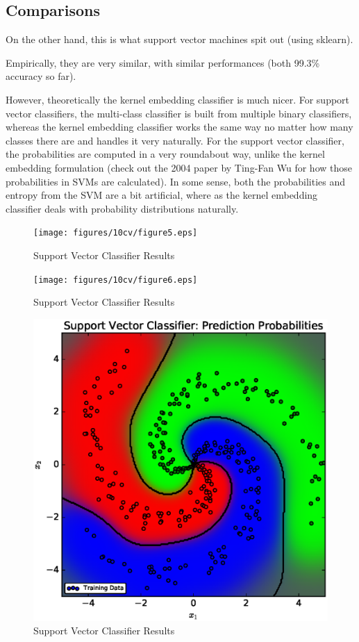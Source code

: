 \documentclass[a4paper, 12pt]{article}
\begin{document}
	\newpage
	\subsection{Comparisons}

		On the other hand, this is what support vector machines spit out (using sklearn).
		
		Empirically, they are very similar, with similar performances (both 99.3\% accuracy so far).
		
		However, theoretically the kernel embedding classifier is much nicer. For support vector classifiers, the multi-class classifier is built from multiple binary classifiers, whereas the kernel embedding classifier works the same way no matter how many classes there are and handles it very naturally. For the support vector classifier, the probabilities are computed in a very roundabout way, unlike the kernel embedding formulation (check out the 2004 paper by Ting-Fan Wu for how those probabilities in SVMs are calculated). In some sense, both the probabilities and entropy from the SVM are a bit artificial, where as the kernel embedding classifier deals with probability distributions naturally.
		

		\begin{figure}[!htbp]
			\centering
			\texttt{[image: figures/10cv/figure5.eps]}
			\caption{Support Vector Classifier Results}
			\label{fig:figure_5}
		\end{figure}
		
		\begin{figure}[!htbp]
			\centering
			\texttt{[image: figures/10cv/figure6.eps]}
			\caption{Support Vector Classifier Results}
			\label{fig:figure_6}
		\end{figure}
		
		\begin{figure}[!htbp]
			\centering
			\includegraphics[width=0.8\linewidth]{figures/10cv/figure7.eps}
			\caption{Support Vector Classifier Results}
			\label{fig:figure_7}
		\end{figure}
		
%
\end{document}
